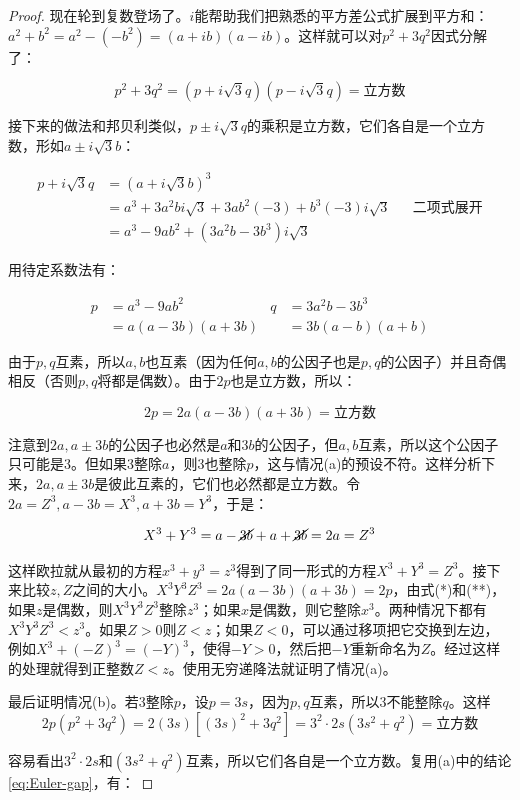 \documentclass[b5paper]{ctexart}
\begin{document}
\begin{proof}
现在轮到复数登场了。$i$能帮助我们把熟悉的平方差公式扩展到平方和：$a^2 + b^2 = a^2 - (-b^2) = (a + ib)(a - ib)$。这样就可以对$p^2 + 3q^2$因式分解了：

\[
p^2 + 3q^2 = (p + i\sqrt{3}q)(p - i\sqrt{3}q) = \text{立方数}
\]

接下来的做法和邦贝利类似，$p \pm i\sqrt{3}q$的乘积是立方数，它们各自是一个立方数，形如$a \pm i\sqrt{3}b$：

\begin{align*}
p + i\sqrt{3}q &= (a + i\sqrt{3}b)^3 \\
  &= a^3 + 3a^2bi\sqrt{3} + 3ab^2(-3) + b^3(-3)i\sqrt{3} && \text{二项式展开} \\
  &= a^3 - 9ab^2 + (3a^2b - 3b^3)i\sqrt{3}
\end{align*}

用待定系数法有：

\begin{align} \label{eq:Euler-gap}
p &= a^3 - 9ab^2       & q &= 3a^2b - 3b^3 \\
  &= a(a - 3b)(a + 3b) &   &= 3b(a - b)(a + b)
\end{align}

由于$p, q$互素，所以$a, b$也互素（因为任何$a, b$的公因子也是$p, q$的公因子）并且奇偶相反（否则$p, q$将都是偶数）。由于$2p$也是立方数，所以：

\[
2p = 2a(a - 3b)(a + 3b) = \text{立方数}
\]

注意到$2a, a \pm 3b$的公因子也必然是$a$和$3b$的公因子，但$a, b$互素，所以这个公因子只可能是3。但如果3整除$a$，则3也整除$p$，这与情况(a)的预设不符。这样分析下来，$2a, a \pm 3b$是彼此互素的，它们也必然都是立方数。令$2a = Z^3, a - 3b = X^3, a+ 3b = Y^3$，于是：

\[
X^3 + Y^3 = a - \cancel{3b} + a + \cancel{3b} = 2a = Z^3
\]

这样欧拉就从最初的方程$x^3 + y^3 = z^3$得到了同一形式的方程$X^3 + Y^3 = Z^3$。接下来比较$z, Z$之间的大小。$X^3Y^3Z^3 = 2a(a - 3b)(a + 3b) = 2p$，由式(*)和(**)，如果$z$是偶数，则$X^3Y^3Z^3$整除$z^3$；如果$x$是偶数，则它整除$x^3$。两种情况下都有$X^3Y^3Z^3 < z^3$。如果$Z > 0$则$Z < z$；如果$Z < 0$，可以通过移项把它交换到左边，例如$X^3 + (-Z)^3 = (-Y)^3$，使得$-Y > 0$，然后把$-Y$重新命名为$Z$。经过这样的处理就得到正整数$Z < z$。使用无穷递降法就证明了情况(a)。

最后证明情况(b)。若3整除$p$，设$p = 3s$，因为$p, q$互素，所以3不能整除$q$。这样
\[
2p(p^2 + 3q^2) = 2(3s)[(3s)^2 + 3q^2] = 3^2\cdot 2s(3s^2 + q^2) = \text{立方数}
\]

容易看出$3^2\cdot 2s$和$(3s^2 + q^2)$互素，所以它们各自是一个立方数。复用(a)中的结论\cref{eq:Euler-gap}，有：


\end{proof}
\end{document}
